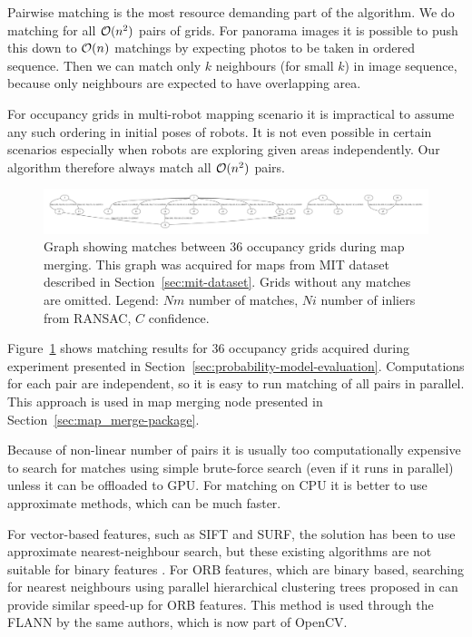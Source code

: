 Pairwise matching is the most resource demanding part of the algorithm. We do matching for all $\operatorname{\mathcal{O}}(n^2)$ pairs of grids. For panorama images it is possible to push this down to $\operatorname{\mathcal{O}}(n)$ matchings by expecting photos to be taken in ordered sequence. Then we can match only $k$ neighbours (for small $k$) in image sequence, because only neighbours are expected to have overlapping area.

For occupancy grids in multi-robot mapping scenario it is impractical to assume any such ordering in initial poses of robots. It is not even possible in certain scenarios especially when robots are exploring given areas independently. Our algorithm therefore always match all $\operatorname{\mathcal{O}}(n^2)$ pairs.

\begin{figure}
    \centering
    \includegraphics[width=\textwidth]{../img/matches.pdf}
    \caption[Matches between occupancy grids during map merging.]{Graph showing matches between $36$ occupancy grids during map merging. This graph was acquired for maps from MIT dataset described in Section~\ref{sec:mit-dataset}. Grids without any matches are omitted. Legend: $Nm$ number of matches, $Ni$ number of inliers from \gls{RANSAC}, $C$ confidence.}
    \label{fig:matches}
\end{figure}

Figure~\ref{fig:matches} shows matching results for $36$ occupancy grids acquired during experiment presented in Section~\ref{sec:probability-model-evaluation}. Computations for each pair are independent, so it is easy to run matching of all pairs in parallel. This approach is used in map merging node presented in Section~\ref{sec:map_merge-package}.

Because of non-linear number of pairs it is usually too computationally expensive to search for matches using simple brute-force search (even if it runs in parallel) unless it can be offloaded to GPU. For matching on CPU it is better to use approximate methods, which can be much faster.

For vector-based features, such as \gls{SIFT} and \gls{SURF}, the solution has been to use approximate nearest-neighbour search, but these existing algorithms are not suitable for binary features \cite{Muja2012}. For \gls{ORB} features, which are binary based, searching for nearest neighbours using parallel hierarchical clustering trees proposed in \cite{Muja2012} can provide similar speed-up for \gls{ORB} features. This method is used through the \gls{FLANN} by the same authors, which is now part of \gls{OpenCV}.

